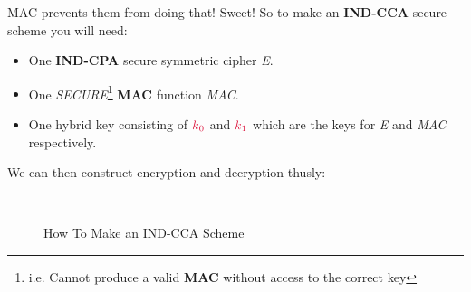     MAC prevents them from doing that! Sweet! So to make an \textbf{IND-CCA} secure scheme you will need:
    \begin{itemize}
        \item One \textbf{IND-CPA} secure symmetric cipher \emph{E}.
        \item One \emph{SECURE}\footnote{i.e. Cannot produce a valid \textbf{MAC} without access to the correct key} \textbf{MAC} function \emph{MAC}.
        \item One hybrid key consisting of $\csubk{0}$ and $\csubk{1}$ which are the keys for \emph{E} and \emph{MAC} respectively.
    \end{itemize}

    We can then construct encryption and decryption thusly:
    \begin{figure}[htp!]
    \centering
    ~
    \caption{How To Make an IND-CCA Scheme}
    \label{fig:ind-cca-ed}
    \end{figure}

